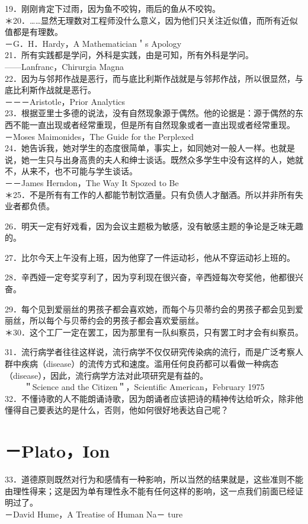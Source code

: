 19．刚刚肯定下过雨，因为鱼不咬钩，雨后的鱼从不咬钩。\\
＊20．……显然无理数对工程师没什么意义，因为他们只关注近似值，而所有近似值都是有理数。\\
－G．H．Hardy，A Mathematician＇s Apology\\
21．所有实践都是学问，外科是实践，由是可知，所有外科是学问。\\
——Lanfranc，Chirurgia Magna\\
22．因为与邻邦作战是恶行，而与底比利斯作战就是与邻邦作战，所以很显然，与底比利斯作战就是恶行。\\
－－－Aristotle，Prior Analytics\\
23．根据亚里士多德的说法，没有自然现象源于偶然。他的论据是：源于偶然的东西不能一直出现或者经常重现，但是所有自然现象或者一直出现或者经常重现。\\
－Moses Maimonides，The Guide for the Perplexed\\
24．她告诉我，她对学生的态度很简单，事实上，如同她对一般人一样。也就是说，她一生只与出身高贵的夫人和绅士谈话。既然众多学生中没有这样的人，她就不，从来不，也不可能与学生谈话。\\
－－James Herndon，The Way It Spozed to Be\\
＊25．不是所有有工作的人都能节制饮酒量。只有负债人才酗酒。所以并非所有失业者都负债。

26．明天一定有好戏看，因为会议主题极为敏感，没有敏感主题的争论是乏味无趣的。

27．比尔今天上午没有上班，因为他穿了一件运动衫，他从不穿运动衫上班的。

28．辛西娅一定夸奖亨利了，因为亨利现在很兴奋，辛西娅每次夸奖他，他都很兴奋。

29．每个见到爱丽丝的男孩子都会喜欢她，而每个与贝蒂约会的男孩子都会见到爱丽丝，所以每个与贝蒂约会的男孩子都会喜欢爱丽丝。\\
＊30．这个工厂一定在罢工，因为那里有一队纠察员，只有罢工时才会有纠察员。

31．流行病学者往往这样说，流行病学不仅仅研究传染病的流行，而是广泛考察人群中疾病（disease）的流传方式和速度。滥用任何良药都可以看做一种病态（disease），因此，流行病学方法对此项研究是有益的。\\
$\qquad$ ＂Science and the Citizen＂，Scientific American，February 1975\\
32．不懂诗歌的人不能朗诵诗歌，因为朗诵者应该把诗的精神传达给听众，除非他懂得自己要表达的是什么，否则，他如何很好地表达自己呢？

\section*{－Plato，Ion}
33．道德原则既然对行为和感情有一种影响，所以当然的结果就是，这些准则不能由理性得来；这是因为单有理性永不能有任何这样的影响，这一点我们前面已经证明过了。\\
－David Hume，A Treatise of Human Na－ ture

